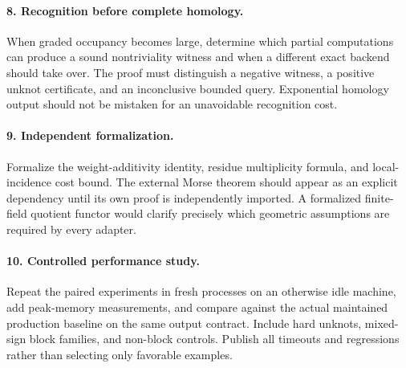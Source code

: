 \documentclass[11pt,letterpaper]{article}
\theoremstyle{remark}\newtheorem{remark}[theorem]{Remark}
\begin{document}
\paragraph{8. Recognition before complete homology.}
When graded occupancy becomes large, determine which partial computations can produce a sound nontriviality witness and when a different exact backend should take over. The proof must distinguish a negative witness, a positive unknot certificate, and an inconclusive bounded query. Exponential homology output should not be mistaken for an unavoidable recognition cost.

\paragraph{9. Independent formalization.}
Formalize the weight-additivity identity, residue multiplicity formula, and local-incidence cost bound. The external Morse theorem should appear as an explicit dependency until its own proof is independently imported. A formalized finite-field quotient functor would clarify precisely which geometric assumptions are required by every adapter.

\paragraph{10. Controlled performance study.}
Repeat the paired experiments in fresh processes on an otherwise idle machine, add peak-memory measurements, and compare against the actual maintained production baseline on the same output contract. Include hard unknots, mixed-sign block families, and non-block controls. Publish all timeouts and regressions rather than selecting only favorable examples.

\appendix
\end{document}

